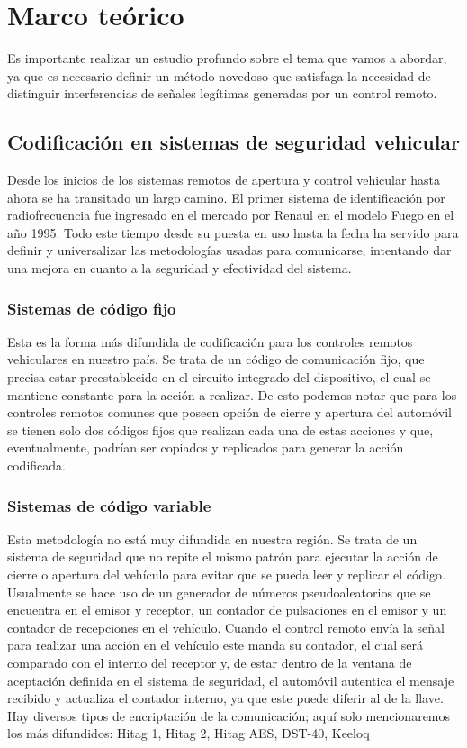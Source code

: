 \documentclass[12pt]{report}
\begin{document}
\section{Marco teórico}


Es importante realizar un estudio profundo sobre el tema que vamos a abordar, ya que es necesario definir un método novedoso que satisfaga
la necesidad de distinguir interferencias de señales legítimas generadas por un control remoto.

\subsection{Codificación en sistemas de seguridad vehicular}

Desde los inicios de los sistemas remotos de apertura y control vehicular hasta ahora se ha transitado un largo camino. 
El primer sistema de identificación por radiofrecuencia fue ingresado en el mercado por Renaul en el modelo Fuego en el año 1995.
Todo este tiempo desde su puesta en uso hasta la fecha ha servido para definir y universalizar las metodologías usadas para comunicarse,
intentando dar una mejora en cuanto a la seguridad y efectividad del sistema.\par

\subsubsection{Sistemas de código fijo}

Esta es la forma más difundida de codificación para los controles remotos vehiculares en nuestro país. Se trata de un código de comunicación
fijo, que precisa estar preestablecido en el circuito integrado del dispositivo, el cual se mantiene constante para la acción a realizar.
De esto podemos notar que para los controles remotos comunes que poseen opción de cierre y apertura del automóvil se tienen solo dos códigos
fijos que realizan cada una de estas acciones y que, eventualmente, podrían ser copiados y replicados para generar la acción codificada. 

\subsubsection{Sistemas de código variable}

Esta metodología no está muy difundida en nuestra región. Se trata de un sistema de seguridad que no repite el mismo patrón para ejecutar la 
acción de cierre o apertura del vehículo para evitar que se pueda leer y replicar el código. Usualmente se hace uso de un generador de números 
pseudoaleatorios que se encuentra en el emisor y receptor, un contador de pulsaciones en el emisor y un contador de recepciones en el vehículo.
Cuando el control remoto envía la señal para realizar una acción en el vehículo este manda su contador, el cual será comparado con el 
interno del receptor y, de estar dentro de la ventana de aceptación definida en el sistema de seguridad, el automóvil autentica el mensaje 
recibido y actualiza el contador interno, ya que este puede diferir al de la llave.
Hay diversos tipos de encriptación de la comunicación; aquí solo mencionaremos los más difundidos: Hitag 1, Hitag 2, Hitag AES, DST-40, Keeloq
\end{document}
